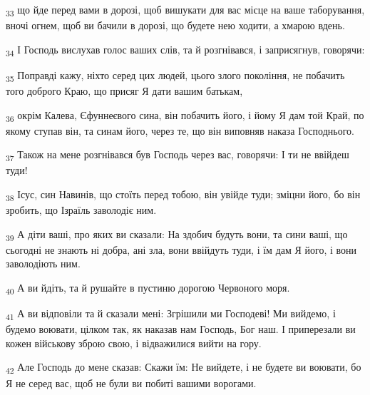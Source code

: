 \begin{tcolorbox}
\textsubscript{33} що йде перед вами в дорозі, щоб вишукати для вас місце на ваше таборування, вночі огнем, щоб ви бачили в дорозі, що будете нею ходити, а хмарою вдень.
\end{tcolorbox}
\begin{tcolorbox}
\textsubscript{34} І Господь вислухав голос ваших слів, та й розгнівався, і заприсягнув, говорячи:
\end{tcolorbox}
\begin{tcolorbox}
\textsubscript{35} Поправді кажу, ніхто серед цих людей, цього злого покоління, не побачить того доброго Краю, що присяг Я дати вашим батькам,
\end{tcolorbox}
\begin{tcolorbox}
\textsubscript{36} окрім Калева, Єфуннеєвого сина, він побачить його, і йому Я дам той Край, по якому ступав він, та синам його, через те, що він виповняв наказа Господнього.
\end{tcolorbox}
\begin{tcolorbox}
\textsubscript{37} Також на мене розгнівався був Господь через вас, говорячи: І ти не ввійдеш туди!
\end{tcolorbox}
\begin{tcolorbox}
\textsubscript{38} Ісус, син Навинів, що стоїть перед тобою, він увійде туди; зміцни його, бо він зробить, що Ізраїль заволодіє ним.
\end{tcolorbox}
\begin{tcolorbox}
\textsubscript{39} А діти ваші, про яких ви сказали: На здобич будуть вони, та сини ваші, що сьогодні не знають ні добра, ані зла, вони ввійдуть туди, і їм дам Я його, і вони заволодіють ним.
\end{tcolorbox}
\begin{tcolorbox}
\textsubscript{40} А ви йдіть, та й рушайте в пустиню дорогою Червоного моря.
\end{tcolorbox}
\begin{tcolorbox}
\textsubscript{41} А ви відповіли та й сказали мені: Згрішили ми Господеві! Ми вийдемо, і будемо воювати, цілком так, як наказав нам Господь, Бог наш. І приперезали ви кожен військову зброю свою, і відважилися вийти на гору.
\end{tcolorbox}
\begin{tcolorbox}
\textsubscript{42} Але Господь до мене сказав: Скажи їм: Не вийдете, і не будете ви воювати, бо Я не серед вас, щоб не були ви побиті вашими ворогами.
\end{tcolorbox}

